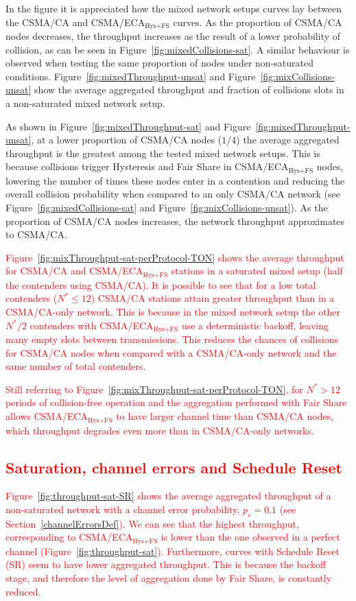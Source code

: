 	In the figure it is appreciated how the mixed network setups curves lay between the CSMA/CA and CSMA/ECA$_{\text{Hys+FS}}$ curves. As the proportion of CSMA/CA nodes decreases, the throughput increases as the result of a lower probability of collision, as can be seen in Figure~\ref{fig:mixedCollisions-sat}. A similar behaviour is observed when testing the same proportion of nodes under non-saturated conditions. Figure~\ref{fig:mixedThroughput-unsat} and Figure~\ref{fig:mixCollisions-unsat} show the average aggregated throughput and fraction of collisions slots in a non-saturated mixed network setup.
	
	As shown in Figure~\ref{fig:mixedThroughput-sat} and Figure~\ref{fig:mixedThroughput-unsat}, at a lower proportion of CSMA/CA nodes ($1/4$) the average aggregated throughput is the greatest among the tested mixed network setups. This is because collisions trigger Hysteresis and Fair Share in CSMA/ECA$_{\text{Hys+FS}}$ nodes, lowering the number of times these nodes enter in a contention and reducing the overall collision probability when compared to an only CSMA/CA network (see Figure~\ref{fig:mixedCollisions-sat} and Figure~\ref{fig:mixCollisions-unsat}). As the proportion of CSMA/CA nodes increases, the network throughput approximates to CSMA/CA.
	
	\textcolor{red}{Figure~\ref{fig:mixThroughput-sat-perProtocol-TON} shows the average throughput for CSMA/CA and CSMA/ECA$_{\text{Hys+FS}}$ stations in a saturated mixed setup (half the contenders using CSMA/CA). It is possible to see that for a low total contenders ($N^{*}\leq 12$) CSMA/CA stations attain greater throughput than in a CSMA/CA-only network. This is because in the mixed network setup the other $N^{*}/2$ contenders with CSMA/ECA$_{\text{Hys+FS}}$ use a deterministic backoff, leaving many empty slots between transmissions. This reduces the chances of collisions for CSMA/CA nodes when compared with a CSMA/CA-only network and the same number of total contenders.} 
	
	\textcolor{red}{Still referring to Figure~\ref{fig:mixThroughput-sat-perProtocol-TON}, for $N^{*}>12$ periods of collision-free operation and the aggregation performed with Fair Share allows CSMA/ECA$_{\text{Hys+FS}}$ to have larger channel time than CSMA/CA nodes, which throughput degrades even more than in CSMA/CA-only networks.}
	
	\textcolor{red}{\subsection{Saturation, channel errors and Schedule Reset}\label{resultsSchedRest}}
	\textcolor{red}{Figure~\ref{fig:throughput-sat-SR} shows the average aggregated throughput of a non-saturated network with a channel error probability, $p_e=0.1$ (see Section~\ref{channelErrorsDef}). We can see that the highest throughput, corresponding to CSMA/ECA$_{\text{Hys+FS}}$ is lower than the one observed in a perfect channel (Figure~\ref{fig:throughput-sat}). Furthermore, curves with Schedule Reset (SR) seem to have lower aggregated throughput. This is because the backoff stage, and therefore the level of aggregation done by Fair Share, is constantly reduced.}
	
